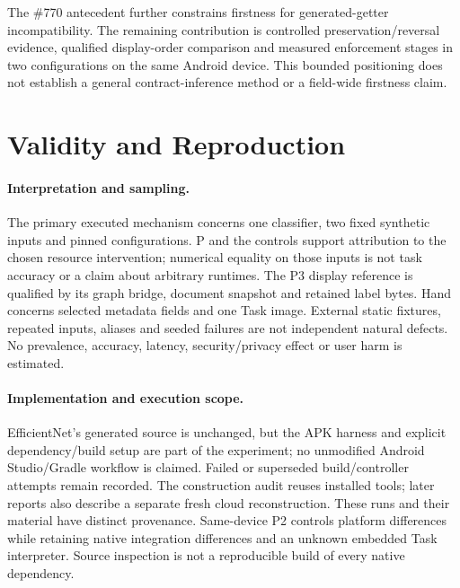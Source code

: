 \documentclass[10pt,twocolumn,letterpaper]{article}
\begin{document}
The \#770 antecedent further constrains firstness for generated-getter incompatibility. The remaining contribution is controlled preservation/reversal evidence, qualified display-order comparison and measured enforcement stages in two configurations on the same Android device. This bounded positioning does not establish a general contract-inference method or a field-wide firstness claim.

\section{Validity and Reproduction}
\label{sec:validity}
\paragraph{Interpretation and sampling.}
The primary executed mechanism concerns one classifier, two fixed synthetic inputs and pinned configurations. P and the controls support attribution to the chosen resource intervention; numerical equality on those inputs is not task accuracy or a claim about arbitrary runtimes. The P3 display reference is qualified by its graph bridge, document snapshot and retained label bytes. Hand concerns selected metadata fields and one Task image. External static fixtures, repeated inputs, aliases and seeded failures are not independent natural defects. No prevalence, accuracy, latency, security/privacy effect or user harm is estimated.

\paragraph{Implementation and execution scope.}
EfficientNet's generated source is unchanged, but the APK harness and explicit dependency/build setup are part of the experiment; no unmodified Android Studio/Gradle workflow is claimed. Failed or superseded build/controller attempts remain recorded. The construction audit reuses installed tools; later reports also describe a separate fresh cloud reconstruction. These runs and their material have distinct provenance. Same-device P2 controls platform differences while retaining native integration differences and an unknown embedded Task interpreter. Source inspection is not a reproducible build of every native dependency.
\end{document}
